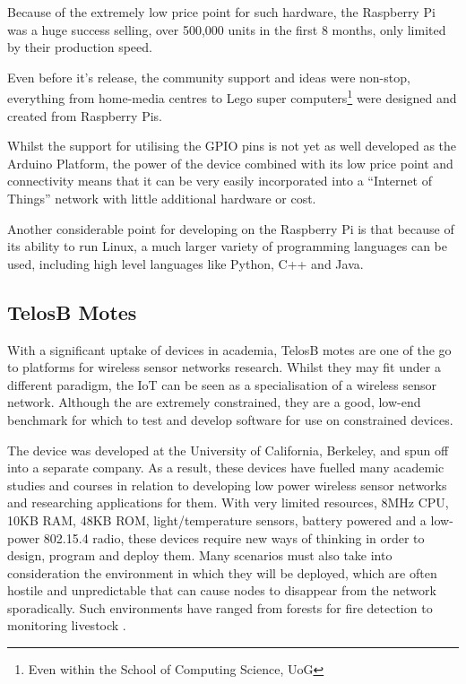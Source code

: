 Because of the extremely low price point for such hardware, the Raspberry Pi was a huge success selling, over 500,000 units in the first 8 months, only limited by their production speed.\cite{RaspberryPiSold}

Even before it's release, the community support and ideas were non-stop, everything from home-media centres\cite{Raspbmc} to Lego super computers\footnote{Even within the School of Computing Science, UoG}\cite{LegoSuperComputer} were designed and created from Raspberry Pis.

Whilst the support for utilising the GPIO pins is not yet as well developed as the Arduino Platform, the power of the device combined with its low price point and connectivity means that it can be very easily incorporated into a ``Internet of Things'' network with little additional hardware or cost.

Another considerable point for developing on the Raspberry Pi is that because of its ability to run Linux, a much larger variety of programming languages can be used, including high level languages like Python, C++ and Java.

\subsection{TelosB Motes} %
\label{sub:telos_b_motes}

With a significant uptake of devices in academia, TelosB motes are one of the go to platforms for wireless sensor networks research. Whilst they may fit under a different paradigm, the IoT can be seen as a specialisation of a wireless sensor network. Although the are extremely constrained, they are a good, low-end benchmark for which to test and develop software for use on constrained devices. 

The device was developed at the University of California, Berkeley, and spun off into a separate company. As a result, these devices have fuelled many academic studies and courses in relation to developing low power wireless sensor networks and researching applications for them. With very limited resources, 8MHz CPU, 10KB RAM, 48KB ROM, light/temperature sensors, battery powered and a low-power 802.15.4 radio, these devices require new ways of thinking in order to design, program and deploy them. Many scenarios must also take into consideration the environment in which they will be deployed, which are often hostile and unpredictable that can cause nodes to disappear from the network sporadically. Such environments have ranged from forests for fire detection\cite{FireDetection} to monitoring livestock \cite{Livestock}.

